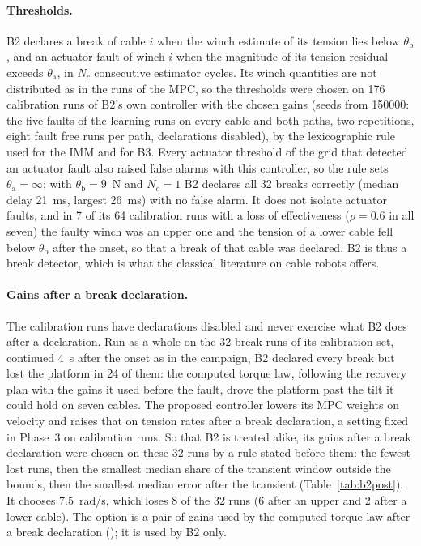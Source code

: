 \documentclass[10pt]{article}
\begin{document}
\paragraph{Thresholds.} B2 declares a break of cable $i$ when the winch estimate of its tension lies below $\theta_{\mathrm{b}}$, and an actuator fault of winch $i$ when the magnitude of its tension residual exceeds $\theta_{\mathrm{a}}$, in $N_c$ consecutive estimator cycles. Its winch quantities are not distributed as in the runs of the MPC, so the thresholds were chosen on 176 calibration runs of B2's own controller with the chosen gains (seeds from 150000: the five faults of the learning runs on every cable and both paths, two repetitions, eight fault free runs per path, declarations disabled), by the lexicographic rule used for the IMM and for B3. Every actuator threshold of the grid that detected an actuator fault also raised false alarms with this controller, so the rule sets $\theta_{\mathrm{a}}=\infty$; with $\theta_{\mathrm{b}}=9$~N and $N_c=1$ B2 declares all 32 breaks correctly (median delay 21~ms, largest 26~ms) with no false alarm. It does not isolate actuator faults, and in 7 of its 64 calibration runs with a loss of effectiveness ($\rho=0.6$ in all seven) the faulty winch was an upper one and the tension of a lower cable fell below $\theta_{\mathrm{b}}$ after the onset, so that a break of that cable was declared. B2 is thus a break detector, which is what the classical literature on cable robots offers.

\paragraph{Gains after a break declaration.} The calibration runs have declarations disabled and never exercise what B2 does after a declaration. Run as a whole on the 32 break runs of its calibration set, continued 4~s after the onset as in the campaign, B2 declared every break but lost the platform in 24 of them: the computed torque law, following the recovery plan with the gains it used before the fault, drove the platform past the tilt it could hold on seven cables. The proposed controller lowers its MPC weights on velocity and raises that on tension rates after a break declaration, a setting fixed in Phase~3 on calibration runs. So that B2 is treated alike, its gains after a break declaration were chosen on these 32 runs by a rule stated before them: the fewest lost runs, then the smallest median share of the transient window outside the bounds, then the smallest median error after the transient (Table~\ref{tab:b2post}). It chooses 7.5~rad/s, which loses 8 of the 32 runs (6 after an upper and 2 after a lower cable). The option is a pair of gains used by the computed torque law after a break declaration (); it is used by B2 only.
\end{document}
